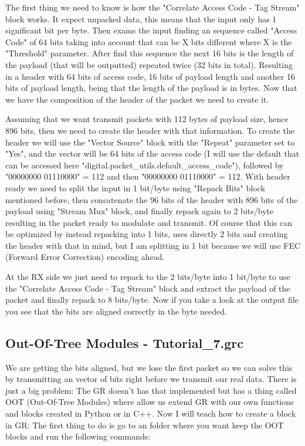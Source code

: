 \documentclass[a4paper, 10pt, conference]{ieeeconf}      %
\begin{document}
    The first thing we need to know is how the "Correlate Access Code - Tag Stream" block works. It expect unpacked data, this means that the input only has 1 significant bit per byte. Then exams the input finding an sequence called "Access Code" of 64 bits taking into account that can be X bits different where X is the "Threshold" parameter. After find this sequence the next 16 bits is the length of the payload (that will be outputted) repeated twice (32 bits in total). Resulting in a header with 64 bits of access code, 16 bits of payload length and another 16 bits of payload length, being that the length of the payload is in bytes. Now that we have the composition of the header of the packet we need to create it.
    
    Assuming that we want transmit packets with 112 bytes of payload size, hence 896 bits, then we need to create the header with that information. 
    To create the header we will use the "Vector Source" block with the "Repeat" parameter set to "Yes", and the vector will be 64 bits of the access code (I will use the default that can be accessed here "digital.packet\_utils.default\_access\_code"), followed by "00000000 01110000" = 112 and then "00000000 01110000" = 112. With header ready we need to split the input in 1 bit/byte using "Repack Bits" block mentioned before, then concatenate the 96 bits of the header with 896 bits of the payload using "Stream Mux" block, and finally repack again to 2 bits/byte resulting in the packet ready to modulate and transmit. Of course that this can be optimized by instead repacking into 1 bits, uses directly 2 bits and creating the header with that in mind, but I am splitting in 1 bit because we will use FEC (Forward Error Correction) encoding ahead.
    
    At the RX side we just need to repack to the 2 bits/byte into 1 bit/byte to use the "Correlate Access Code - Tag Stream" block and extract the payload of the packet and finally repack to 8 bits/byte. Now if you take a look at the output file you see that the bits are aligned correctly in the byte needed.
    
\subsection{Out-Of-Tree Modules - Tutorial\_7.grc}
    We are getting the bits aligned, but we lose the first packet so we can solve this by transmitting an vector of bits right before we transmit our real data. There is just a big problem: The GR doesn't has that implemented but has a thing called OOT (Out-Of-Tree Modules) where allow us extend GR with our own functions and blocks created in Python or in C++. Now I will teach how to create a block in GR: The first thing to do is go to an folder where you want keep the OOT blocks and run the following commands: 
\end{document}

